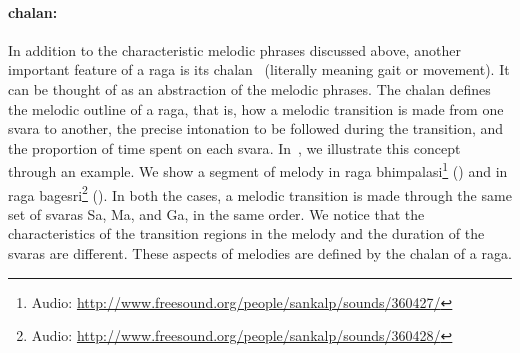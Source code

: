 \paragraph{\Gls{chalan}:} In addition to the characteristic melodic phrases discussed above, another important feature of a \gls{raga} is its \gls{chalan}~\citep{rao1999raga,Bagchee1998,Suvarnalata2014} (literally meaning gait or movement). It can be thought of as an abstraction of the melodic phrases. The \gls{chalan} defines the melodic outline of a \gls{raga}, that is, how a melodic transition is made from one \gls{svara} to another, the precise intonation to be followed during the transition, and the proportion of time spent on each \gls{svara}. In~, we illustrate this concept through an example. We show a segment of melody in \gls{raga} \gls{bhimpalasi}\footnote{Audio: \url{http://www.freesound.org/people/sankalp/sounds/360427/}} () and in \gls{raga} \gls{bagesri}\footnote{Audio: \url{http://www.freesound.org/people/sankalp/sounds/360428/}} ().  In both the cases, a melodic transition is made through the same set of \glspl{svara} Sa, Ma, and Ga, in the same order. We notice that the characteristics of the transition regions in the melody and the duration of the \glspl{svara} are different. These aspects of melodies are defined by the \gls{chalan} of a \gls{raga}.

